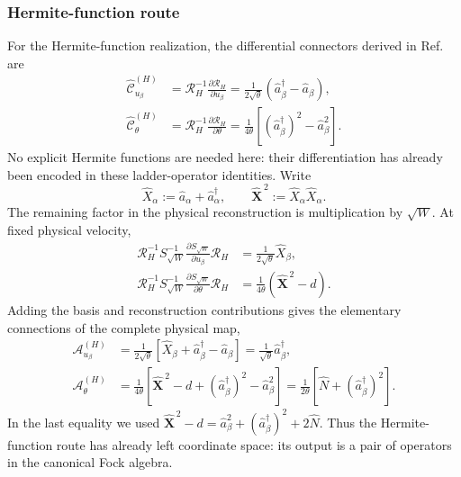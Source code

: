 \documentclass[11pt,oneside]{article}
\numberwithin{equation}{section}
\theoremstyle{definition}
\begin{document}
\subsubsection{Hermite-function route}
\label{subsubsec:maxwell_Hermite_connection_route}

For the Hermite-function realization, the differential connectors derived in Ref.~\cite{Karlin2026LFHFock} are
\begin{align}
\widehat{\mathcal C}^{(H)}_{u_\beta}
&=\mathcal R_H^{-1}\frac{\partial \mathcal R_H}{\partial u_\beta}
=\frac{1}{2\sqrt\theta}(\hat a_\beta^\dagger-\hat a_\beta),
\label{eq:maxwell_Hermite_Cu}
\\
\widehat{\mathcal C}^{(H)}_\theta
&=\mathcal R_H^{-1}\frac{\partial \mathcal R_H}{\partial\theta}
=\frac{1}{4\theta}
\left[(\hat a_\beta^\dagger)^2-\hat a_\beta^2\right].
\label{eq:maxwell_Hermite_Ctheta}
\end{align}
No explicit Hermite functions are needed here: their differentiation has already been encoded in these ladder-operator identities.  Write
\begin{equation}
\widehat X_\alpha:=\hat a_\alpha+\hat a_\alpha^\dagger,
\qquad
\widehat{\bm X}^{\,2}:=\widehat X_\alpha\widehat X_\alpha.
\end{equation}
The remaining factor in the physical reconstruction is multiplication by $\sqrt W$.  At fixed physical velocity,
\begin{align}
\mathcal R_H^{-1}S_{\sqrt W}^{-1}
\frac{\partial S_{\sqrt W}}{\partial u_\beta}\mathcal R_H
&=\frac{1}{2\sqrt\theta}\widehat X_\beta,
\label{eq:maxwell_Hermite_weight_u}
\\
\mathcal R_H^{-1}S_{\sqrt W}^{-1}
\frac{\partial S_{\sqrt W}}{\partial\theta}\mathcal R_H
&=\frac{1}{4\theta}
\left(\widehat{\bm X}^{\,2}-d\right).
\label{eq:maxwell_Hermite_weight_theta}
\end{align}
Adding the basis and reconstruction contributions gives the elementary connections of the complete physical map,
\begin{align}
\mathcal A^{(H)}_{u_\beta}
&=\frac{1}{2\sqrt\theta}
\left[\widehat X_\beta+\hat a_\beta^\dagger-\hat a_\beta\right]
=\frac{1}{\sqrt\theta}\hat a_\beta^\dagger,
\label{eq:maxwell_Hermite_full_u}
\\
\mathcal A^{(H)}_\theta
&=\frac{1}{4\theta}
\left[
\widehat{\bm X}^{\,2}-d
+(\hat a_\beta^\dagger)^2-\hat a_\beta^2
\right]
=\frac{1}{2\theta}
\left[\hat N+(\hat a_\beta^\dagger)^2\right].
\label{eq:maxwell_Hermite_full_theta}
\end{align}
In the last equality we used
$\widehat{\bm X}^{\,2}-d=\hat a_\beta^2+(\hat a_\beta^\dagger)^2+2\hat N$.
Thus the Hermite-function route has already left coordinate space: its output is a pair of operators in the canonical Fock algebra.
\end{document}
